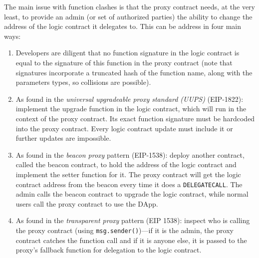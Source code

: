 
The main issue with function clashes is that the proxy contract needs, at the very least, to provide an admin (or set of authorized parties) the ability to change the address of the logic contract it delegates to. This can be address in four main ways:

\begin{enumerate}


\item Developers are diligent that no function signature in the logic contract is equal to the signature of this function in the proxy contract (note that signatures incorporate a truncated hash of the function name, along with the parameters types, so collisions are possible). 

\item As found in the \emph{universal upgradeable proxy standard (UUPS)} (EIP-1822): implement the upgrade function in the logic contract, which will run in the context of the proxy contract. Its exact function signature must be hardcoded into the proxy contract. Every logic contract update must include it or further updates are impossible.

\item As found in the \textit{beacon proxy} pattern (EIP-1538): deploy another contract, called the beacon contract, to hold the address of the logic contract and implement the setter function for it. The proxy contract will get the logic contract address from the beacon every time it does a \texttt{DELEGATECALL}. The admin calls the beacon contract to upgrade the logic contract, while normal users call the proxy contract to use the DApp. 

\item As found in the \textit{transparent proxy} pattern (EIP 1538): inspect who is calling the proxy contract (using \texttt{msg.sender()})---if it is the admin, the proxy contract catches the function call and if it is anyone else, it is passed to the proxy's fallback function for delegation to the logic contract. 

\end{enumerate}

